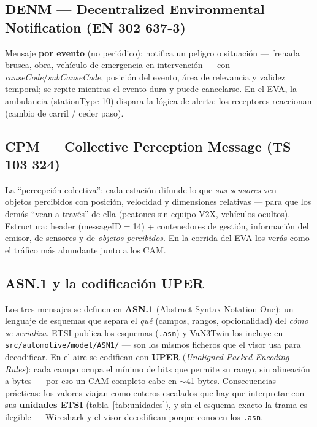 \documentclass[11pt,a4paper]{article}
\begin{document}
\subsection{DENM --- Decentralized Environmental Notification (EN 302 637-3)}

Mensaje \textbf{por evento} (no periódico): notifica un peligro o situación
--- frenada brusca, obra, vehículo de emergencia en intervención --- con
\emph{causeCode}/\emph{subCauseCode}, posición del evento, área de relevancia
y validez temporal; se repite mientras el evento dura y puede cancelarse. En
el EVA, la ambulancia (stationType 10) dispara la lógica de alerta; los
receptores reaccionan (cambio de carril / ceder paso).

\subsection{CPM --- Collective Perception Message (TS 103 324)}

La ``percepción colectiva'': cada estación difunde lo que \emph{sus sensores}
ven --- objetos percibidos con posición, velocidad y dimensiones relativas ---
para que los demás ``vean a través'' de ella (peatones sin equipo V2X,
vehículos ocultos). Estructura: header (messageID$=$14) + contenedores de
gestión, información del emisor, de sensores y de \emph{objetos percibidos}.
En la corrida del EVA los verás como el tráfico más abundante junto a los CAM.

\subsection{ASN.1 y la codificación UPER}

Los tres mensajes se definen en \textbf{ASN.1} (Abstract Syntax Notation
One): un lenguaje de esquemas que separa el \emph{qué} (campos, rangos,
opcionalidad) del \emph{cómo se serializa}. ETSI publica los esquemas
(\texttt{.asn}) y VaN3Twin los incluye en
\texttt{src/automotive/model/ASN1/} --- son los mismos ficheros que el visor
usa para decodificar. En el aire se codifican con \textbf{UPER}
(\emph{Unaligned Packed Encoding Rules}): cada campo ocupa el mínimo de bits
que permite su rango, sin alineación a bytes --- por eso un CAM completo cabe
en $\sim$41 bytes. Consecuencias prácticas: los valores viajan como enteros
escalados que hay que interpretar con sus \textbf{unidades ETSI}
(tabla~\ref{tab:unidades}), y sin el esquema exacto la trama es ilegible ---
Wireshark y el visor decodifican porque conocen los \texttt{.asn}.
\end{document}
